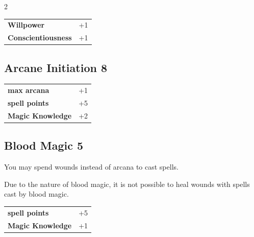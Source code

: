 \begin{multicols}{2}
\begin{tcolorbox}
\begin{tabular}{@{}ll@{}}
    \textbf{Willpower} & +1\\
    \textbf{Conscientiousness} & +1\\
\end{tabular}


\end{tcolorbox}

\begin{tcolorbox}
    \subsection*{Arcane Initiation \hfill \small{8 }}
    \tcblower




\begin{tabular}{@{}ll@{}}
    \textbf{max arcana} & +1\\
    \textbf{spell points} & +5\\
    \textbf{Magic Knowledge} & +2\\
\end{tabular}


\end{tcolorbox}

\begin{tcolorbox}
    \subsection*{Blood Magic \hfill \small{5 }}
    \tcblower
You may spend wounds instead of arcana to cast spells.

Due to the nature of blood magic, it is not possible to heal wounds with spells cast by blood magic.


\vspace{3mm}

\begin{tabular}{@{}ll@{}}
    \textbf{spell points} & +5\\
    \textbf{Magic Knowledge} & +1\\
\end{tabular}



\end{tcolorbox}
\end{multicols}
